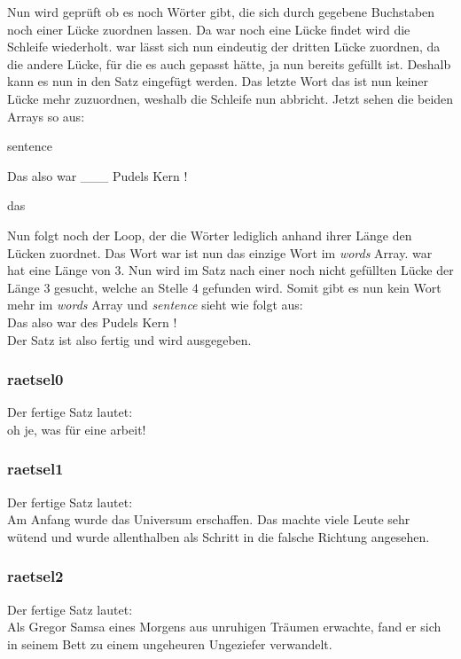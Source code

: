 \documentclass[a4paper, 12pt]{scrartcl}
\begin{document}
Nun  wird  geprüft  ob  es  noch  Wörter  gibt,  die  sich  durch  gegebene  Buchstaben  noch  einer  Lücke zuordnen lassen. Da {\glqq}war{\grqq} noch eine Lücke findet wird die Schleife wiederholt. {\glqq}war{\grqq} lässt sich nun eindeutig der dritten Lücke zuordnen, da die andere Lücke, für die es auch gepasst hätte, ja nun bereits gefüllt  ist. Deshalb kann es nun in den Satz eingefügt werden. Das letzte Wort {\glqq}das{\grqq} ist nun keiner Lücke mehr zuzuordnen, weshalb die Schleife nun abbricht. Jetzt sehen die beiden Arrays so aus:

\begin{labeling}{sentence}
    \item [sentence] Das also war {\_}{\_}{\_} Pudels Kern !
    \item [words] das
\end{labeling}

Nun folgt noch der Loop, der die Wörter lediglich anhand ihrer Länge den Lücken zuordnet. Das Wort {\glqq}war{\grqq} ist nun das einzige Wort im \emph{words} Array. {\glqq}war{\grqq} hat eine Länge von 3. Nun wird im Satz nach einer noch nicht gefüllten Lücke der Länge 3 gesucht, welche an Stelle 4 gefunden wird. Somit gibt es nun kein Wort mehr im \emph{words} Array und \emph{sentence} sieht wie folgt aus:\\
Das also war des Pudels Kern !\\
Der Satz ist also fertig und wird ausgegeben.

\subsubsection{raetsel0}
Der fertige Satz lautet:\\
oh je, was für eine arbeit!

\subsubsection{raetsel1}
Der fertige Satz lautet:\\
Am Anfang wurde das Universum erschaffen. Das machte viele Leute sehr wütend und wurde allenthalben als Schritt in die falsche Richtung angesehen.

\subsubsection{raetsel2}
Der fertige Satz lautet:\\
Als Gregor Samsa eines Morgens aus unruhigen Träumen erwachte, fand er sich in seinem Bett zu einem ungeheuren Ungeziefer verwandelt.
\end{document}
